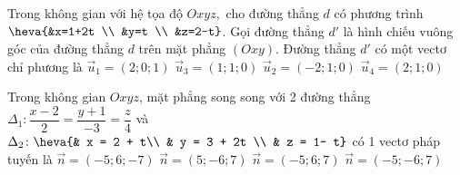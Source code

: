 	\begin{ex}%
	Trong không gian với hệ tọa độ $Oxyz,$ cho đường thẳng $d$ có phương trình $\heva{&x=1+2t \\ &y=t \\ &z=2-t}$. Gọi đường thẳng $d'$ là hình chiếu vuông góc của đường thẳng $d$ trên mặt phẳng $(Oxy)$. Đường thẳng $d'$ có một vectơ chỉ phương là
	\choice
	{$\overrightarrow{u}_1=(2;0;1)$}
	{$\overrightarrow{u}_3=(1;1;0)$}
	{$\overrightarrow{u}_2=(-2;1;0)$}
	{\True $\overrightarrow{u}_4=(2;1;0)$}
	\end{ex}
	\begin{ex}%
	Trong không gian $Oxyz$, mặt phẳng song song với 2 đường thẳng $\Delta_1 \colon \dfrac{x - 2}{2} = \dfrac{y + 1}{-3} = \dfrac{z}{4}$ và $\Delta_2 \colon \heva{& x = 2 + t\\ & y = 3 + 2t \\ & z = 1- t}$ có 1 vectơ pháp tuyến là 
	\choice
	{$\vec{n} = (-5; 6; -7)$}
	{$\vec{n} = (5; - 6 ; 7)$}
	{\True $\vec{n} = (-5; 6; 7)$}
	{$\vec{n} = (-5; -6; 7)$}
	\end{ex}
